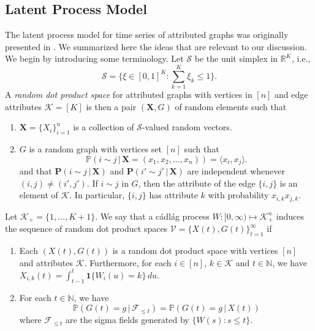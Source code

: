 \documentclass[draftcls]{IEEEtran}
\theoremstyle{definition}
\begin{document}
\subsection{Latent Process Model}
The latent process model for time series of attributed graphs was
originally presented in
\cite{lee:_laten_proces_model_time_attrib_random_graph}. We summarized
here the ideas that are relevant to our discussion. We begin by
introducing some terminology. Let $\mathscr{S}$ be the unit simplex in
$\mathbb{R}^{K}$, i.e.,
\begin{equation}
  \mathscr{S} = \{ \xi \in [0,1]^{K}
  \colon \sum_{k = 1}^{K} \xi_k \leq 1 \}.
\end{equation}
A {\em random dot product space} for attributed graphs with vertices
in $[n]$ and edge attributes $\mathscr{K} = [K]
$ is then a pair $(\mathbf{X},G)$ of random elements such that
\begin{enumerate}
\item $\mathbf{X} = \{X_i\}_{i = 1}^{n}$ is a collection of
  $\mathscr{S}$-valued random vectors.
\item $G$ is a random graph with vertices set $[n]$ such that
  \begin{equation}
    \label{eq:1}
    \mathbb{P}(i \sim j \,|\, \mathbf{X} = (x_1, x_2, \dots,
    x_n)) = \langle x_i, x_j \rangle.
  \end{equation}
  and that $\mathbf{P}(i \sim j \,|\, \mathbf{X})$ and $\mathbf{P}(i' \sim
  j' \,|\, \mathbf{X})$ are independent whenever $(i,j) \not = (i',j')$. If
  $i \sim j$ in $G$, then the attribute of the edge $\{i,j\}$ is an
  element of $\mathscr{K}$. In particular, $\{i,j\}$ has attribute $k$
  with probability $x_{i,k} x_{j,k}$. 
\end{enumerate}
Let $\mathscr{K}_{+} = \{1,\dots,K+1\}$. We say that a c\'{a}dl\'{a}g
process $W \colon [0,\infty) \mapsto \mathscr{K}_{+}^{n}$ induces the
sequence of random dot product spaces $\mathscr{V} = \{X(t), G(t)\}_{t
  = 1}^{\infty}$ if
\begin{enumerate}
\item Each $(X(t), G(t))$ is a random dot product space with vertices
  $[n]$ and attributes $\mathscr{K}$. Furthermore, for each
  $i \in [n]$, $k \in \mathscr{K}$ and $t \in \mathbb{N}$, we have
  $X_{i,k}(t)  = \int_{t - 1}^{t}{ \mathbf{1}\{W_i(u) = k\}\, du}$.
\item  For each $t \in \mathbb{N}$, we have
  \begin{equation}
    \label{eq:2}
    \mathbb{P}(G(t) = g \,|\, \mathscr{F}_{\leq t}) = \mathbb{P}(G(t) = g \,|\, X(t))
  \end{equation}
where $\mathscr{F}_{\leq t}$ are the sigma fields generated by $\{W(s)
  \colon s \leq t\}$.
\end{enumerate}
\end{document}
